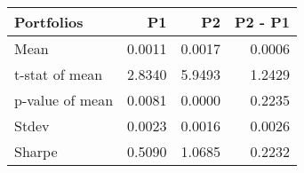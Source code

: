 \begin{tabular}{lrrr}
\toprule
Portfolios & P1 & P2 & P2 - P1 \\
\midrule
Mean & 0.0011 & 0.0017 & 0.0006 \\
t-stat of mean & 2.8340 & 5.9493 & 1.2429 \\
p-value of mean & 0.0081 & 0.0000 & 0.2235 \\
Stdev & 0.0023 & 0.0016 & 0.0026 \\
Sharpe & 0.5090 & 1.0685 & 0.2232 \\
\bottomrule
\end{tabular}

